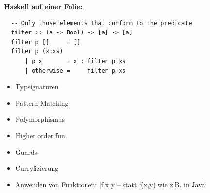 \documentclass[unknownkeysallowed]{beamer}
\begin{document}
  \begin{frame}[fragile]
  
  \Large\textbf{\underline{Haskell auf einer Folie:}} \bigskip \normalsize

  \begin{verbatim}
  -- Only those elements that conform to the predicate
  filter :: (a -> Bool) -> [a] -> [a]
  filter p []     = []
  filter p (x:xs) 
      | p x       = x : filter p xs
      | otherwise =     filter p xs
  \end{verbatim}
  
  \pause
  
  \begin{multicols}{2}
  \begin{itemize}
  \item Typsignaturen    \pause
  \item Pattern Matching \pause
  \item Polymorphismus   \pause
  \end{itemize}
  
  \columnbreak
  
  \begin{itemize}
  \item Higher order fun. \pause
  \item Guards            \pause
  \item Curryfizierung    \pause
  \end{itemize}

  \end{multicols}

  \begin{itemize}
  \item Anwenden von Funktionen: |f x y -- statt f(x,y) wie z.B. in Java| 
  \end{itemize}
  
\end{frame}

\end{document}

